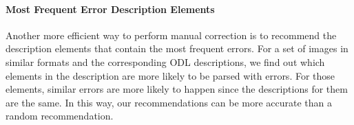 
\paragraph{Most Frequent Error Description Elements}
Another more efficient way to perform manual correction is to 
recommend the description 
elements that contain the most frequent errors. For a set of images 
in similar formats and the corresponding ODL descriptions, 
we find out which elements in the description are more likely 
to be parsed with errors. For those elements, similar errors 
are more likely to happen since the descriptions for them are the 
same. In this way, our recommendations can be more 
accurate than 
a random recommendation. 

